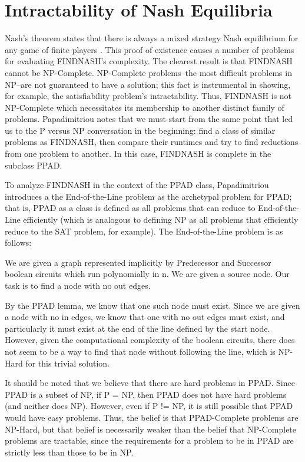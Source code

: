 \documentclass[10pt]{article}
\theoremstyle{definition}
\theoremstyle{remark}
\theoremstyle{definition}
\begin{document}
\section{Intractability of Nash Equilibria}
    Nash's theorem states that there is always a mixed strategy Nash equilibrium for any game of finite players \cite{nash1951noncooperative}. This proof of existence causes a number of problems for evaluating FINDNASH's complexity. The clearest result is that FINDNASH cannot be NP-Complete. NP-Complete problems--the most difficult problems in NP--are not guaranteed to have a solution; this fact is instrumental in showing, for example, the satisfiability problem’s  intractability. Thus, FINDNASH is not NP-Complete which necessitates its membership to another distinct family of problems. Papadimitriou notes that we must start from the same point that led us to the P versus NP conversation in the beginning: find a class of similar problems as FINDNASH, then compare their runtimes and try to find reductions from one problem to another. In this case, FINDNASH is complete in the subclass PPAD. 

To analyze FINDNASH in the context of the PPAD class, Papadimitriou introduces a the End-of-the-Line problem as the archetypal problem for PPAD; that is, PPAD as a class is defined as all problems that can reduce to End-of-the-Line efficiently (which is analogous to defining NP as all problems that efficiently reduce to the SAT problem, for example). The End-of-the-Line problem is as follows: 

We are given a graph represented implicitly by Predecessor and Successor boolean circuits which run polynomially in n. We are given a source node. Our task is to find a node with no out edges.

By the PPAD lemma, we know that one such node must exist. Since we are given a node with no in edges, we know that one with no out edges must exist, and particularly it must exist at the end of the line defined by the start node. However, given the computational complexity of the boolean circuits, there does not seem to be a way to find that node without following the line, which is NP-Hard for this trivial solution.

It should be noted that we believe that there are hard problems in PPAD. Since PPAD is a subset of NP, if P = NP, then PPAD does not have hard problems (and neither does NP). However, even if P != NP, it is still possible that PPAD would have easy problems. Thus, the belief is that PPAD-Complete problems are NP-Hard, but that belief is necessarily weaker than the belief that NP-Complete problems are tractable, since the requirements for a problem to be in PPAD are strictly less than those to be in NP. 
\end{document}
